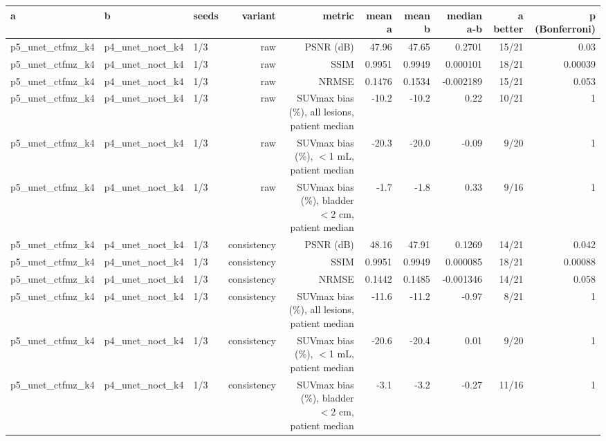 \begin{tabular}{lllrrrrrrr}
\toprule
a & b & seeds & variant & metric & mean a & mean b & median a-b & a better & p (Bonferroni) \\
\midrule
p5\_unet\_ctfmz\_k4 & p4\_unet\_noct\_k4 & 1/3 & raw & PSNR (dB) & 47.96 & 47.65 & 0.2701 & 15/21 & 0.03 \\
p5\_unet\_ctfmz\_k4 & p4\_unet\_noct\_k4 & 1/3 & raw & SSIM & 0.9951 & 0.9949 & 0.000101 & 18/21 & 0.00039 \\
p5\_unet\_ctfmz\_k4 & p4\_unet\_noct\_k4 & 1/3 & raw & NRMSE & 0.1476 & 0.1534 & -0.002189 & 15/21 & 0.053 \\
p5\_unet\_ctfmz\_k4 & p4\_unet\_noct\_k4 & 1/3 & raw & SUVmax bias (\%), all lesions, patient median & -10.2 & -10.2 & 0.22 & 10/21 & 1 \\
p5\_unet\_ctfmz\_k4 & p4\_unet\_noct\_k4 & 1/3 & raw & SUVmax bias (\%), $<$1 mL, patient median & -20.3 & -20.0 & -0.09 & 9/20 & 1 \\
p5\_unet\_ctfmz\_k4 & p4\_unet\_noct\_k4 & 1/3 & raw & SUVmax bias (\%), bladder $<$2 cm, patient median & -1.7 & -1.8 & 0.33 & 9/16 & 1 \\
p5\_unet\_ctfmz\_k4 & p4\_unet\_noct\_k4 & 1/3 & consistency & PSNR (dB) & 48.16 & 47.91 & 0.1269 & 14/21 & 0.042 \\
p5\_unet\_ctfmz\_k4 & p4\_unet\_noct\_k4 & 1/3 & consistency & SSIM & 0.9951 & 0.9949 & 0.000085 & 18/21 & 0.00088 \\
p5\_unet\_ctfmz\_k4 & p4\_unet\_noct\_k4 & 1/3 & consistency & NRMSE & 0.1442 & 0.1485 & -0.001346 & 14/21 & 0.058 \\
p5\_unet\_ctfmz\_k4 & p4\_unet\_noct\_k4 & 1/3 & consistency & SUVmax bias (\%), all lesions, patient median & -11.6 & -11.2 & -0.97 & 8/21 & 1 \\
p5\_unet\_ctfmz\_k4 & p4\_unet\_noct\_k4 & 1/3 & consistency & SUVmax bias (\%), $<$1 mL, patient median & -20.6 & -20.4 & 0.01 & 9/20 & 1 \\
p5\_unet\_ctfmz\_k4 & p4\_unet\_noct\_k4 & 1/3 & consistency & SUVmax bias (\%), bladder $<$2 cm, patient median & -3.1 & -3.2 & -0.27 & 11/16 & 1 \\
\bottomrule
\end{tabular}
